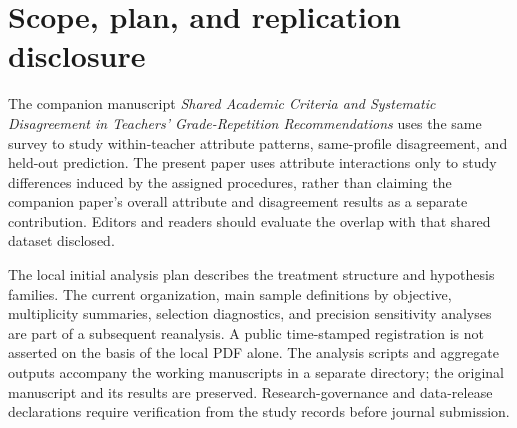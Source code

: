 \section{Scope, plan, and replication disclosure}
\begin{addition}
The companion manuscript \textit{Shared Academic Criteria and Systematic Disagreement in Teachers' Grade-Repetition Recommendations} uses the same survey to study within-teacher attribute patterns, same-profile disagreement, and held-out prediction. The present paper uses attribute interactions only to study differences induced by the assigned procedures, rather than claiming the companion paper's overall attribute and disagreement results as a separate contribution. Editors and readers should evaluate the overlap with that shared dataset disclosed.

The local initial analysis plan describes the treatment structure and hypothesis families. The current organization, main sample definitions by objective, multiplicity summaries, selection diagnostics, and precision sensitivity analyses are part of a subsequent reanalysis. A public time-stamped registration is not asserted on the basis of the local PDF alone. The analysis scripts and aggregate outputs accompany the working manuscripts in a separate directory; the original manuscript and its results are preserved. Research-governance and data-release declarations require verification from the study records before journal submission.
\end{addition}


